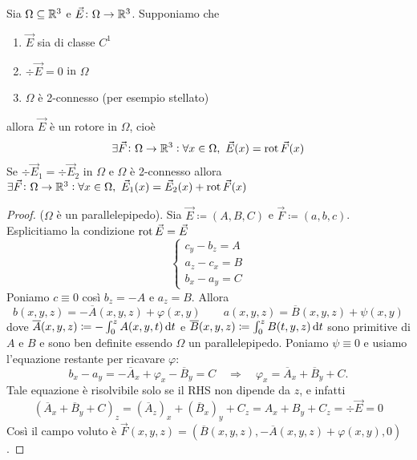 \begin{prop}
	Sia $ \Omega \subseteq \mathbb{R}^3 $ e $ \vec{E} \colon \Omega \to \mathbb{R}^3 $. Supponiamo che
	\begin{enumerate}[label = (\roman*)]
		\item $ \vec{E} $ sia di classe $ C^1 $
		\item $ \div{\vec{E}} = 0 $ in $ \Omega $
		\item $ \Omega $ è 2-connesso (per esempio stellato)
	\end{enumerate} 
	allora $ \vec{E} $ è un rotore in $ \Omega $, cioè 
	\begin{equation}
	\exists \vec{F} \colon \Omega \to \mathbb{R}^3 : \forall x \in \Omega, \ \vec{E}(x) = \operatorname{rot}{\vec{F}}(x)
	\end{equation}
	Se $ \div{\vec{E}_1} = \div{\vec{E}_2} $ in $ \Omega $ e $ \Omega $ è 2-connesso allora $ \exists \vec{F} \colon \Omega \to \mathbb{R}^3 : \forall x \in \Omega, \ \vec{E}_1(x) = \vec{E}_2(x) + \operatorname{rot}{\vec{F}}(x) $
\end{prop}
%
\begin{proof}
	($ \Omega $ è un parallelepipedo).
	Sia $ \vec{E} \coloneqq (A, B, C) $ e $ \vec{F} \coloneqq (a, b, c) $. Esplicitiamo la condizione $ \operatorname{rot}{\vec{E}} = \vec{E} $ 
	\[
		\begin{cases}
			c_y - b_z = A \\
			a_z - c_x = B \\
			b_x - a_y = C
		\end{cases}
	\]
	Poniamo $ c \equiv 0 $ così $ b_z = - A $ e $ a_z = B $. Allora
	\[
		b(x, y, z) = - \overline{A}(x, y, z) + \varphi(x, y) \qquad a(x, y, z) = \overline{B}(x, y, z) + \psi(x, y)
	\]
	dove $ \overline{A}(x, y, z) \coloneqq - \int_{0}^{z} A(x, y, t) \dif{t} $ e $ \overline{B}(x, y, z) \coloneqq \int_{0}^{z} B(t, y, z) \dif{t} $ sono primitive di $ A $ e $ B $ e sono ben definite essendo $ \Omega $ un parallelepipedo. Poniamo $ \psi \equiv 0 $ e usiamo l'equazione restante per ricavare $ \varphi $:
	\[
		b_x - a_y = - \overline{A}_x + \varphi_x - \overline{B}_y = C \quad \Rightarrow \quad \varphi_x = \overline{A}_x + \overline{B}_y + C.
	\]
	Tale equazione è risolvibile solo se il RHS non dipende da $ z $, e infatti 
	\[
		(\overline{A}_x + \overline{B}_y + C)_z = (\overline{A}_z)_x + (\overline{B}_x)_y + C_z = A_x + B_y + C_z = \div{\vec{E}} = 0
	\]
	Così il campo voluto è $ \vec{F}(x, y, z) = (\overline{B}(x, y, z),  - \overline{A}(x, y, z) + \varphi(x, y), 0) $.
\end{proof}


